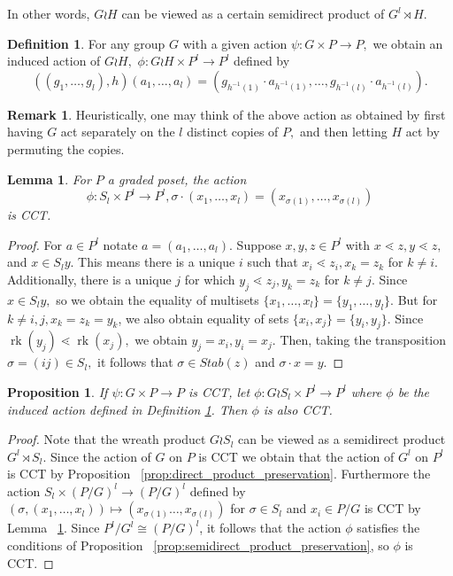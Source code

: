 \documentclass[10 pt]{amsart}
\theoremstyle{plain}
\newtheorem{prop}[thm]{Proposition}
\newtheorem{lem}[thm]{Lemma}
\theoremstyle{definition}
\newtheorem{defn}[thm]{Definition}
\newtheorem{rem}[thm]{Remark}
\theoremstyle{remark}
\numberwithin{equation}{section}
\newcommand\rk{\operatorname{rk}}
\begin{document}
In other words, $G\wr H$ can be viewed as a certain semidirect product of $G^l \rtimes H.$

\begin{defn}
\label{defn:wreath_action}
For any group $G$ with a given action $\psi:G\times P \rightarrow P,$ we obtain an induced action of $G \wr H,$ $\phi:G \wr H \times P^l \rightarrow P^l$ defined by 
$$((g_1,\ldots, g_l),h)(a_1,\ldots, a_l) = (g_{h^{-1}(1)}\cdot a_{h^{-1}(1)},\ldots,g_{h^{-1}(l)} \cdot a_{h^{-1}(l)}).$$
\end{defn}

\begin{rem}
Heuristically, one may think of the above action as obtained by first having $G$ act separately on the $l$ distinct copies of $P,$ and then letting $H$ act by permuting the copies.
\end{rem}

\begin{lem}
\label{lem:symmetric_group_product_action}
For $P$ a graded poset, the action 
$$\phi:S_l \times P^l \rightarrow P^l,\sigma \cdot(x_1,\ldots, x_l) = (x_{\sigma(1)},\ldots, x_{\sigma(l)})$$
is CCT.
\end{lem}
\begin{proof}
For $a \in P^l$ notate $a = (a_1,\ldots, a_l).$ Suppose $x,y,z \in P^l$ with $x\lessdot z,y\lessdot z,$ and $x \in S_ly.$ This means there is a unique $i$ such that $x_i \lessdot z_i,x_k = z_k$ for $k \neq i.$ Additionally, there is a unique $j$ for which $y_j \lessdot z_j,y_k =z_k$ for $k \neq j.$ Since $x \in S_ly,$ so we obtain the equality of multisets $\{x_1,\ldots, x_l\}=\{y_1,\ldots,y_l\}.$ But for $k \neq i,j,x_k = z_k = y_k$, we also obtain equality of sets $\{x_i,x_j\} = \{y_i,y_j\}.$ Since $\rk(y_j) \lessdot \rk(x_j),$ we obtain $y_j = x_i,y_i = x_j.$ Then, taking the transposition $\sigma  = (ij) \in S_l,$ it follows that $\sigma \in Stab(z)$ and $\sigma \cdot x = y.$
\end{proof}

\begin{prop}
\label{prop:wreath_preservation}
If $\psi:G\times P \rightarrow P$ is CCT, let $\phi:G\wr S_l \times P^l \rightarrow P^l$ where $\phi$ be the induced action defined in Definition \ref{defn:wreath_action}. Then $\phi$ is also CCT.
\end{prop}
\begin{proof}
Note that the wreath product $G \wr S_l$ can be viewed as a semidirect product $G^l \rtimes S_l$. Since the action of $G$ on $P$ is CCT we obtain that the action of $G^l$ on $P^l$ is CCT by Proposition ~\ref{prop:direct_product_preservation}.  Furthermore the action $S_l \times (P/G)^l \rightarrow (P/G)^l$ defined by $(\sigma ,(x_1,\ldots, x_l)) \mapsto (x_{\sigma(1)}\ldots, x_{\sigma(l)})$ for $\sigma \in S_l$ and $x_i \in P/G$ is CCT by Lemma ~\ref{lem:symmetric_group_product_action}.  Since $P^l/G^l \cong (P/G)^l$, it follows that the action $\phi$ satisfies the conditions of Proposition ~\ref{prop:semidirect_product_preservation}, so $\phi$ is CCT.
\end{proof}
\end{document}
